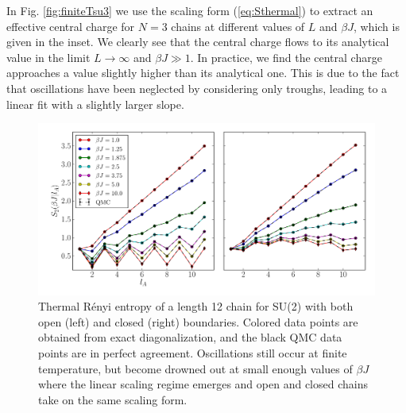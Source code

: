 \documentclass[aps,prb,reprint,floatfix]{revtex4-1}
\begin{document}
In Fig. \ref{fig:finiteTsu3} we use the scaling form (\ref{eq:Sthermal}) to extract an effective central charge for $N=3$ chains at different values of $L$ and $\beta J$, which is given in the inset.  We clearly see that the central charge flows to its analytical value in the limit $L \to \infty$ and $\beta J \gg 1$.  In practice, we find the central charge approaches a value slightly higher than its analytical one.  This is due to the fact that oscillations have been neglected by considering only troughs, leading to a linear fit with a slightly larger slope.  
\begin{figure}
\centerline{\includegraphics[angle=0,width=1.0\columnwidth]{12chain_QMCvsED_FiniteT_OBCandPBC.pdf}}
\caption{Thermal R\'{e}nyi entropy of a length 12 chain for SU(2) with both open (left) and closed (right) boundaries.  Colored data points are obtained from exact diagonalization, and the black QMC data points are in perfect agreement.   Oscillations still occur at finite temperature, but become drowned out at small enough values of $\beta J$ where the linear scaling regime emerges and open and closed chains take on the same scaling form.}
\label{fig:finiteTemergence}
\end{figure}
\end{document}
